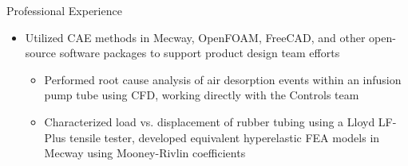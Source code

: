 \documentclass{resume}
\begin{document}
\begin{rSection}{Professional Experience}
    \vspace{-0.5em}
    \begin{itemize}[label={\tiny\raisebox{1ex}{\textbullet}}, noitemsep]
        \item Utilized CAE methods in Mecway, OpenFOAM, FreeCAD, and other open-source software packages to support product design team efforts
        \begin{itemize}[label={\tiny\raisebox{1ex}{\textbullet}}, noitemsep]
            \item Performed root cause analysis of air desorption events within an infusion pump tube using CFD, working directly with the Controls team 
            \item Characterized load vs. displacement of rubber tubing using a Lloyd LF-Plus tensile tester, developed equivalent hyperelastic FEA models in Mecway using Mooney-Rivlin coefficients
        \end{itemize}{}
    \end{itemize}{}
    \vspace{-0.4em}
\end{rSection}
\end{document}
